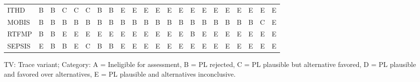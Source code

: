 {\begin{tabular}{lccccccccccccccccccccc}
ITHD & \cellcolor[HTML]{EA4646} B & \cellcolor[HTML]{EA4646} B & \cellcolor[HTML]{9670BD} C & \cellcolor[HTML]{9670BD} C & \cellcolor[HTML]{9670BD} C & \cellcolor[HTML]{EA4646} B & \cellcolor[HTML]{EA4646} B & \cellcolor[HTML]{19C8C8} E & \cellcolor[HTML]{19C8C8} E & \cellcolor[HTML]{19C8C8} E & \cellcolor[HTML]{19C8C8} E & \cellcolor[HTML]{19C8C8} E & \cellcolor[HTML]{19C8C8} E & \cellcolor[HTML]{19C8C8} E & \cellcolor[HTML]{19C8C8} E & \cellcolor[HTML]{19C8C8} E & \cellcolor[HTML]{19C8C8} E & \cellcolor[HTML]{19C8C8} E & \cellcolor[HTML]{19C8C8} E & \cellcolor[HTML]{19C8C8} E & \cellcolor[HTML]{19C8C8} E \\
MOBIS & \cellcolor[HTML]{EA4646} B & \cellcolor[HTML]{EA4646} B & \cellcolor[HTML]{EA4646} B & \cellcolor[HTML]{EA4646} B & \cellcolor[HTML]{EA4646} B & \cellcolor[HTML]{EA4646} B & \cellcolor[HTML]{EA4646} B & \cellcolor[HTML]{EA4646} B & \cellcolor[HTML]{EA4646} B & \cellcolor[HTML]{EA4646} B & \cellcolor[HTML]{EA4646} B & \cellcolor[HTML]{EA4646} B & \cellcolor[HTML]{EA4646} B & \cellcolor[HTML]{EA4646} B & \cellcolor[HTML]{EA4646} B & \cellcolor[HTML]{EA4646} B & \cellcolor[HTML]{EA4646} B & \cellcolor[HTML]{EA4646} B & \cellcolor[HTML]{EA4646} B & \cellcolor[HTML]{9670BD} C & \cellcolor[HTML]{19C8C8} E \\
RTFMP & \cellcolor[HTML]{EA4646} B & \cellcolor[HTML]{EA4646} B & \cellcolor[HTML]{19C8C8} E & \cellcolor[HTML]{19C8C8} E & \cellcolor[HTML]{19C8C8} E & \cellcolor[HTML]{19C8C8} E & \cellcolor[HTML]{19C8C8} E & \cellcolor[HTML]{19C8C8} E & \cellcolor[HTML]{19C8C8} E & \cellcolor[HTML]{19C8C8} E & \cellcolor[HTML]{19C8C8} E & \cellcolor[HTML]{19C8C8} E & \cellcolor[HTML]{19C8C8} E & \cellcolor[HTML]{EA4646} B & \cellcolor[HTML]{19C8C8} E & \cellcolor[HTML]{19C8C8} E & \cellcolor[HTML]{19C8C8} E & \cellcolor[HTML]{19C8C8} E & \cellcolor[HTML]{19C8C8} E & \cellcolor[HTML]{19C8C8} E & \cellcolor[HTML]{19C8C8} E \\
SEPSIS & \cellcolor[HTML]{19C8C8} E & \cellcolor[HTML]{EA4646} B & \cellcolor[HTML]{EA4646} B & \cellcolor[HTML]{19C8C8} E & \cellcolor[HTML]{9670BD} C & \cellcolor[HTML]{EA4646} B & \cellcolor[HTML]{EA4646} B & \cellcolor[HTML]{19C8C8} E & \cellcolor[HTML]{19C8C8} E & \cellcolor[HTML]{19C8C8} E & \cellcolor[HTML]{19C8C8} E & \cellcolor[HTML]{19C8C8} E & \cellcolor[HTML]{19C8C8} E & \cellcolor[HTML]{19C8C8} E & \cellcolor[HTML]{19C8C8} E & \cellcolor[HTML]{19C8C8} E & \cellcolor[HTML]{19C8C8} E & \cellcolor[HTML]{19C8C8} E & \cellcolor[HTML]{19C8C8} E & \cellcolor[HTML]{19C8C8} E & \cellcolor[HTML]{19C8C8} E \\
\bottomrule
\end{tabular}
}
\begin{center}\footnotesize
TV: Trace variant; \quad Category: A = Ineligible for assessment, B = PL rejected, C = PL plausible but alternative favored, D = PL plausible and favored over alternatives, E = PL plausible and alternatives inconclusive.
\end{center}
